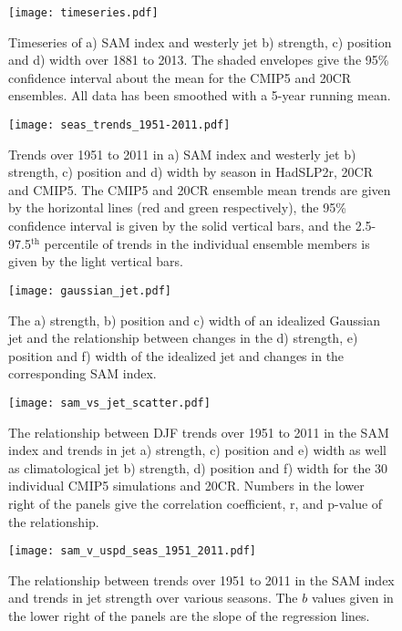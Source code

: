 \documentclass{ametsoc}
\begin{document}
\begin{figure}[t]
  \noindent\texttt{[image: timeseries.pdf]}\\
  \caption{Timeseries of a) SAM index and westerly jet b) strength, c) position and d) width over 1881 to 2013.
   The shaded envelopes give the 95\% confidence interval about the mean for the 
   CMIP5 and 20CR ensembles. All data has been smoothed with a 5-year running mean.}\label{fig:timeseries}
\end{figure}

\begin{figure}[t]
  \noindent\texttt{[image: seas\_trends\_1951-2011.pdf]}\\
  \caption{Trends over 1951 to 2011 in a) SAM index and westerly jet b) strength, c) position and d) width
   by season in HadSLP2r, 20CR and CMIP5. The CMIP5 and 20CR ensemble mean trends are given by the 
   horizontal lines (red and green respectively), 
   the 95\% confidence interval is given by the solid vertical bars, and the 2.5-97.5$^\textrm{th}$
   percentile of trends in the individual ensemble members is given by the light vertical 
   bars. }\label{fig:seas_trends_1951-2011}
\end{figure}

\begin{figure}[t]
  \noindent\texttt{[image: gaussian\_jet.pdf]}\\
  \caption{The a) strength, b) position and c) width of an idealized Gaussian jet and the relationship 
  between changes in the d) strength, e) position and f) width of the idealized jet and changes in the 
  corresponding SAM index.}\label{fig:gaussian_jet}
\end{figure}

\begin{figure}[t]
  \noindent\texttt{[image: sam\_vs\_jet\_scatter.pdf]}\\
  \caption{The relationship between DJF trends over 1951 to 2011 in the SAM index and 
   trends in jet a) strength, c) position
   and e) width as well as climatological jet b) strength, d) position and f) width for the 30
    individual CMIP5 simulations and 20CR. Numbers in the lower right of the panels give the correlation 
    coefficient, r, and p-value of the relationship.}\label{fig:sam_vs_jet_scatter}
\end{figure}

\begin{figure}[t]
  \noindent\texttt{[image: sam\_v\_uspd\_seas\_1951\_2011.pdf]}\\
  \caption{The relationship between trends over 1951 to 2011 in the SAM index and 
   trends in jet strength over various seasons. The $b$ values given in the lower right
   of the panels are the slope of the regression lines.}\label{fig:sam_vs_jet_seas}
\end{figure}
\end{document}
